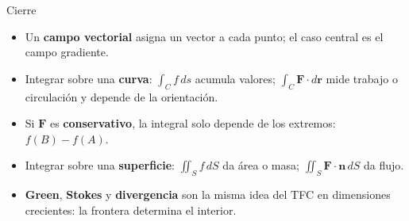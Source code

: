 \documentclass[11pt,aspectratio=169]{beamer}
\begin{document}
\begin{frame}{Cierre}
  \begin{itemize}
    \setlength{\itemsep}{5pt}
    \item Un \textbf{campo vectorial} asigna un vector a cada punto; el caso central es el campo gradiente.
    \pause
    \item Integrar sobre una \textbf{curva}: $\int_C f\,ds$ acumula valores; $\int_C\mathbf F\cdot d\mathbf r$ mide trabajo o circulación y depende de la orientación.
    \pause
    \item Si $\mathbf F$ es \textbf{conservativo}, la integral solo depende de los extremos: $f(B)-f(A)$.
    \pause
    \item Integrar sobre una \textbf{superficie}: $\iint_S f\,dS$ da área o masa; $\iint_S\mathbf F\cdot\mathbf n\,dS$ da flujo.
    \pause
    \item \textbf{Green}, \textbf{Stokes} y \textbf{divergencia} son la misma idea del TFC en dimensiones crecientes: la frontera determina el interior.
  \end{itemize}
\end{frame}
\end{document}
